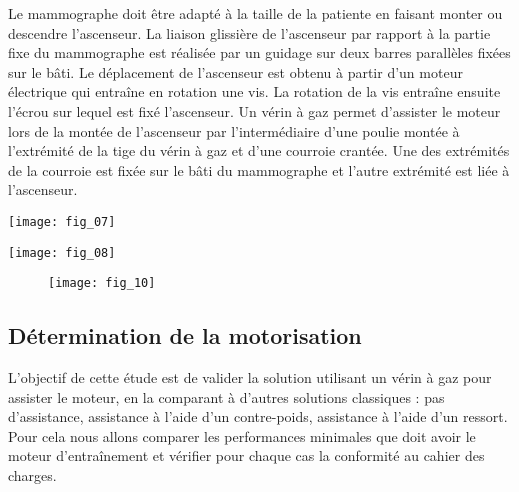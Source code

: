 Le mammographe doit être adapté à la taille de la patiente en faisant monter
ou descendre l’ascenseur. La liaison glissière de l’ascenseur par rapport à la partie
fixe du mammographe est réalisée par un guidage sur deux barres parallèles
fixées sur le bâti. Le déplacement de l’ascenseur est obtenu à partir d’un moteur
électrique qui entraîne en rotation une vis. La rotation de la vis entraîne ensuite
l’écrou sur lequel est fixé l’ascenseur.
Un vérin à gaz permet d’assister le moteur lors de la montée de l’ascenseur par
l’intermédiaire d’une poulie montée à l’extrémité de la tige du vérin à gaz et
d’une courroie crantée. Une des extrémités de la courroie est fixée sur le bâti du
mammographe et l’autre extrémité est liée à l’ascenseur.

\begin{marginfigure}
\texttt{[image: fig\_07]}
\end{marginfigure}

\begin{marginfigure}
\texttt{[image: fig\_08]}
\end{marginfigure}

\begin{figure}[!h]
\texttt{[image: fig\_10]}
\centering
\end{figure}

\fi

%

\subsection*{Détermination de la motorisation}
\begin{obj}
L’objectif de cette étude est de valider la solution utilisant un vérin à gaz
pour assister le moteur, en la comparant à d’autres solutions
classiques : pas d’assistance, assistance à l’aide d’un contre-poids,
assistance à l’aide d’un ressort. Pour cela nous allons comparer les performances
minimales que doit avoir le moteur d’entraînement et vérifier
pour chaque cas la conformité au cahier des charges.
\end{obj}

